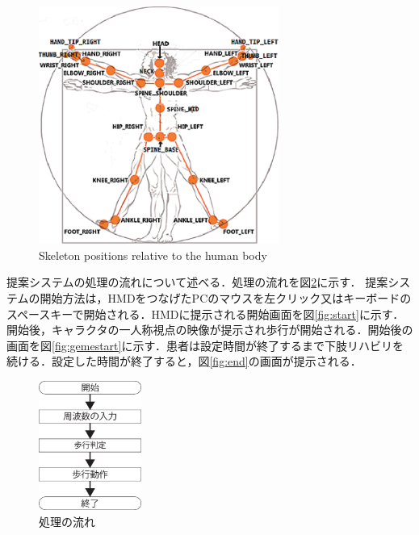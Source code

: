 \begin{figure}[tbp]
	\centering
			\includegraphics[width=0.7\textwidth]{chap2-figure/skelton_position.eps}
	\caption{Skeleton positions relative to the human body}
	\label{fig:skelton_position}
\end{figure}

提案システムの処理の流れについて述べる．処理の流れを図\ref{fig:片桐2}に示す．
提案システムの開始方法は，HMDをつなげたPCのマウスを左クリック又はキーボードのスペースキーで開始される．HMDに提示される開始画面を図\ref{fig:start}に示す．開始後，キャラクタの一人称視点の映像が提示され歩行が開始される．開始後の画面を図\ref{fig:gemestart}に示す．患者は設定時間が終了するまで下肢リハビリを続ける．設定した時間が終了すると，図\ref{fig:end}の画面が提示される．
\begin{figure}[tbp]
	\centering
			\includegraphics[width=0.3\textwidth]{chap2-figure/katagiri2.eps}
	\caption{処理の流れ}
	\label{fig:片桐2}
\end{figure}

